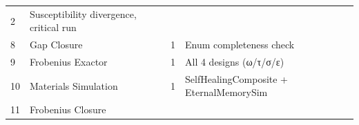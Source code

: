 \documentclass[12pt,a4paper]{article}
\begin{document}
\begin{longtable}[]{@{}llll@{}}
\begin{minipage}[t]{0.20\columnwidth}
2\strut
\end{minipage} & \begin{minipage}[t]{0.29\columnwidth}\raggedright
Susceptibility divergence, critical run\strut
\end{minipage}\tabularnewline
\begin{minipage}[t]{0.09\columnwidth}\raggedright
8\strut
\end{minipage} & \begin{minipage}[t]{0.31\columnwidth}\raggedright
Gap Closure\strut
\end{minipage} & \begin{minipage}[t]{0.20\columnwidth}\raggedright
1\strut
\end{minipage} & \begin{minipage}[t]{0.29\columnwidth}\raggedright
Enum completeness check\strut
\end{minipage}\tabularnewline
\begin{minipage}[t]{0.09\columnwidth}\raggedright
9\strut
\end{minipage} & \begin{minipage}[t]{0.31\columnwidth}\raggedright
Frobenius Exactor\strut
\end{minipage} & \begin{minipage}[t]{0.20\columnwidth}\raggedright
1\strut
\end{minipage} & \begin{minipage}[t]{0.29\columnwidth}\raggedright
All 4 designs (ω/τ/σ/ε)\strut
\end{minipage}\tabularnewline
\begin{minipage}[t]{0.09\columnwidth}\raggedright
10\strut
\end{minipage} & \begin{minipage}[t]{0.31\columnwidth}\raggedright
Materials Simulation\strut
\end{minipage} & \begin{minipage}[t]{0.20\columnwidth}\raggedright
1\strut
\end{minipage} & \begin{minipage}[t]{0.29\columnwidth}\raggedright
SelfHealingComposite + EternalMemorySim\strut
\end{minipage}\tabularnewline
\begin{minipage}[t]{0.09\columnwidth}\raggedright
11\strut
\end{minipage} & \begin{minipage}[t]{0.31\columnwidth}\raggedright
Frobenius Closure\strut
\end{minipage} & \begin{minipage}[t]{0.20\columnwidth}\raggedright

\end{minipage}
\end{longtable}
\end{document}
